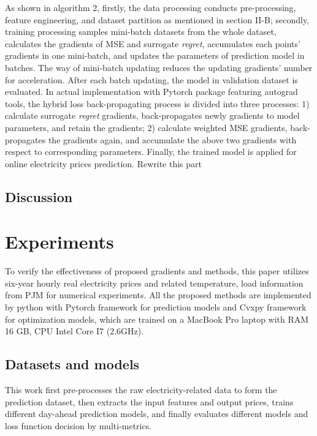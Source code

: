 \documentclass[journal]{IEEEtran}
\newcommand{\slw}{\color{blue}}
\begin{document}
As shown in algorithm 2, firstly, the data processing conducts 
pre-processing, feature engineering, and dataset partition  as mentioned in section II-B; secondly, training processing samples mini-batch datasets from the whole dataset, calculates the gradients of MSE and surrogate \textit{regret}, accumulates each points' gradients in one mini-batch, and updates the parameters of prediction model in batches. The way of mini-batch updating reduces the updating gradients' number for acceleration. After each batch updating, the model in validation dataset is evaluated. In actual implementation with Pytorch package featuring autograd tools, the hybrid loss back-propagating process is divided into three processes: 1) calculate surrogate \textit{regret} gradients, back-propagates newly gradients to model parameters, and retain the gradients; 2) calculate weighted MSE gradients, back-propagates the  gradients again, and accumulate the above two gradients with respect to corresponding parameters. Finally, the trained model is applied for online electricity prices prediction. {\slw Rewrite this part}

\subsection{Discussion}

\section{Experiments}
To verify the effectiveness of proposed gradients and methods, this paper utilizes six-year hourly real electricity prices and related temperature, load information from PJM for numerical experiments\cite{PJM}. All the proposed methods are implemented by python with Pytorch framework for prediction models and Cvxpy framework for optimization models, which are trained on a MacBook Pro laptop with RAM 16 GB, CPU Intel Core I7 (2.6GHz).

\subsection{Datasets and models}
This work first pre-processes the raw electricity-related data to form the prediction dataset, then extracts the input features and output prices, trains different day-ahead prediction models, and finally evaluates different models and loss function decision by multi-metrics. 
\end{document}
